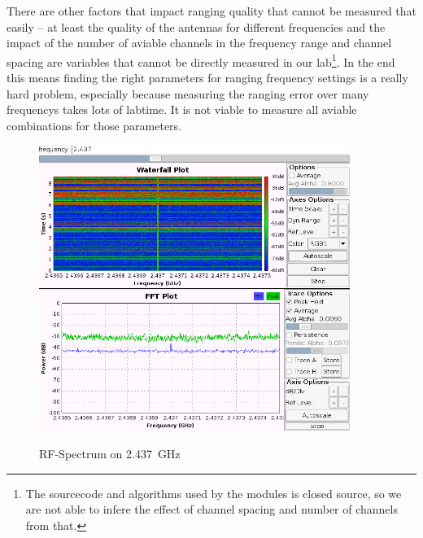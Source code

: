 There are other factors that impact ranging quality that cannot be measured that easily – at least the quality of the antennas for different frequencies and the impact of the number of aviable channels in the frequency range and channel spacing are variables that cannot be directly measured in our lab\footnote{The sourcecode and algorithms used by the modules is closed source, so we are not able to infere the effect of channel spacing and number of channels from that.}. 
In the end this means finding the right parameters for ranging frequency settings is a really hard problem, especially because measuring the ranging error over many frequencys takes lots of labtime. 
It is not viable to measure all aviable combinations for those parameters.


\begin{figure}[H]
	\centering
\includegraphics[width=0.9\textwidth]{figures/ch6.png}
\label{spectrum2437}
\caption{RF-Spectrum on \SI{2.437}{\giga\hertz}}
\end{figure}

